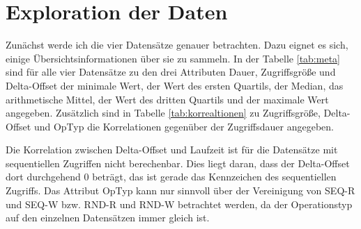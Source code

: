 \documentclass[
	12pt,
	a4paper,
	BCOR10mm,
	DIV14,
	listof=totoc,
	bibliography=totoc,
	headsepline
]{scrreprt}
\begin{document}
\section{Exploration der Daten}
\label{eval:exploration}
Zunächst werde ich die vier Datensätze genauer betrachten. Dazu eignet es sich, einige Übersichtsinformationen über sie zu sammeln.
In der Tabelle \ref{tab:meta} sind für alle vier Datensätze zu den drei Attributen Dauer, Zugriffsgröße und Delta-Offset der minimale Wert, der Wert des ersten Quartils, der Median, das arithmetische Mittel, der Wert des dritten Quartils und der maximale Wert angegeben. Zusätzlich sind in Tabelle \ref{tab:korrealtionen} zu Zugriffsgröße, Delta-Offset und OpTyp die Korrelationen gegenüber der Zugriffsdauer angegeben.\medskip

Die Korrelation zwischen Delta-Offset und Laufzeit ist für die Datensätze mit sequentiellen Zugriffen nicht berechenbar. Dies liegt daran, dass der Delta-Offset dort durchgehend 0 beträgt, das ist gerade das Kennzeichen des sequentiellen Zugriffs.
Das Attribut OpTyp kann nur sinnvoll über der Vereinigung von SEQ-R
und SEQ-W bzw. RND-R und RND-W betrachtet werden, da der Operationstyp auf den einzelnen Datensätzen immer gleich ist.
\end{document}
